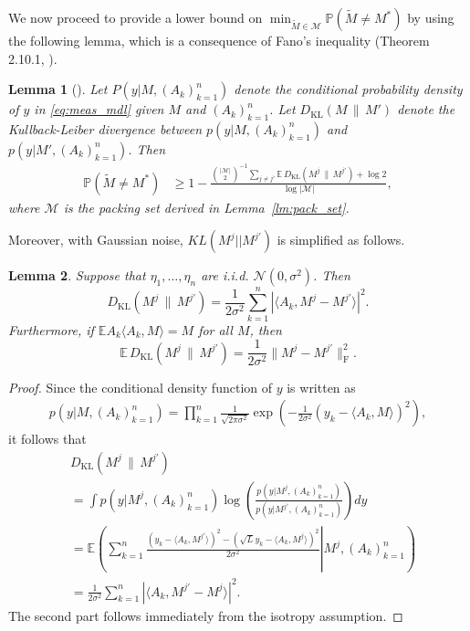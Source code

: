 \documentclass[11pt]{article}
\newtheorem{lemma}{Lemma}[section]
\begin{document}
We now proceed to provide a lower bound on $\min_{\widetilde{M} \in \mathcal{M}} \mathbb{P}( \widetilde{M} \neq M^*)$ by using the following lemma, which is a consequence of Fano's inequality (Theorem 2.10.1,  \citep{cover1991elements}).

\begin{lemma}[{\citep[Eq. (6.17)]{cai2016matrix}}]
Let $P(y|M,(A_k)_{k=1}^n)$ denote the conditional probability density of $y$ in \eqref{eq:meas_mdl} given $M$ and $(A_k)_{k=1}^n$. Let $D_{\mathrm{KL}}(M \,\|\, M')$ denote the Kullback-Leiber divergence between $p(y|M,(A_k)_{k=1}^n)$ and $p(y|M',(A_k)_{k=1}^n)$. 
Then
\begin{align}
\label{eq:Fanos}
     \mathbb{P} (\widetilde{M} \neq M^*) & \geq 1 - \frac{ {\binom{|\mathcal{M}|}{2}} ^{-1} \sum_{j \neq j'} \mathbb{E} \, D_{\mathrm{KL}} (M^j \,\|\, M^{j'})+ \log 2}{\log | \mathcal{M}|},
\end{align} 
where $\mathcal{M}$ is the packing set derived in Lemma~\ref{lm:pack_set}.
\end{lemma}

\noindent Moreover, with Gaussian noise, $KL(M^j||M^{j'})$ is simplified as follows.
\begin{lemma} 
Suppose that $\eta_1,\dots,\eta_n$ are i.i.d. $\mathcal{N}(0,\sigma^2)$. 
Then
\begin{equation*}
     D_{\mathrm{KL}}(M^j \,\|\, M^{j'}) = \frac{1}{2 \sigma^2} \sum_{k=1}^n |\langle A_k, M^j - M^{j'} \rangle|^2.
\end{equation*} 
Furthermore, if $\mathbb{E} A_k \langle A_k, M \rangle = M$ for all $M$, then
\begin{equation*}
    \mathbb{E} \, D_\mathrm{KL}(M^j \,\|\, M^{j'}) = \frac{1}{2\sigma^2} \| M^j - M^{j'} \|_\mathrm{F}^2.
\end{equation*}
\end{lemma}

\begin{proof}
Since the conditional density function of $y$ is written as
\begin{align*}
    p(y|M,(A_k)_{k=1}^n) 
    = \prod_{k=1}^{n} \frac{1}{\sqrt{2 \pi \sigma^2}} \exp\left( - \frac{1}{2\sigma^2} \left ( y_k - \langle A_k, M \rangle \right )^2 \right),
\end{align*}
it follows that
\begin{align*}
    & D_\mathrm{KL}(M^j \,\|\, M^{j'}) \\
    & = \int p(y|M^j,(A_k)_{k=1}^n) \log \left ( \frac{p(y|M^j,(A_k)_{k=1}^n)}{p(y|M^{j'},(A_k)_{k=1}^n)} \right ) dy \\
    & = \mathbb{E} \left( \left. \sum_{k=1}^n \frac{(y_k - \langle A_k, M^{j'} \rangle)^2 - (\sqrt{L} y_k - \langle A_k, M^j \rangle)^2}{ 2\sigma^2} \right| M^j, (A_k)_{k=1}^n \right) \\
    & = \frac{1}{2\sigma^2} \sum_{k=1}^n |\langle A_k, M^{j'}-M^j \rangle|^2.
\end{align*}
The second part follows immediately from the isotropy assumption. 
\end{proof}
\end{document}
